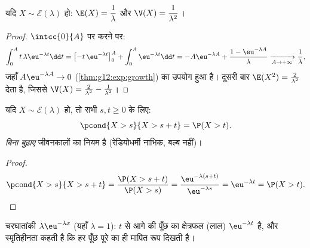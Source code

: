 \begin{proposition}\label{prop:g12:contdist:expomoments}
यदि $X \sim \mathcal E(\lambda)$ हो: $\E(X) = \dfrac{1}{\lambda}$ और $\V(X) = \dfrac{1}{\lambda^2}$।
\end{proposition}

\begin{proof}
$\intcc{0}{A}$ पर  करने पर:
\[
\int_0^A t\,\lambda\eu^{-\lambda t}\dd t
= \bigl[-t\,\eu^{-\lambda t}\bigr]_0^A + \int_0^A \eu^{-\lambda t}\dd t
= -A\eu^{-\lambda A} + \frac{1 - \eu^{-\lambda A}}{\lambda}
\xrightarrow[A\to+\infty]{} \frac1\lambda,
\]
जहाँ $A\eu^{-\lambda A} \to 0$ (\cref{thm:g12:exp:growth}) का उपयोग हुआ है। दूसरी बार  $\E(X^2) = \frac{2}{\lambda^2}$ देता है, जिससे
$\V(X) = \frac{2}{\lambda^2} - \frac{1}{\lambda^2}$।
\end{proof}

\begin{theorem}[स्मृतिहीनता]\label{thm:g12:contdist:memoryless}
यदि $X \sim \mathcal E(\lambda)$ हो, तो सभी $s, t \geq 0$ के लिए:
\[
\pcond{X > s}{X > s + t} = \P(X > t) .
\]
 \emph{बिना बुढ़ाए} जीवनकालों का नियम है (रेडियोधर्मी नाभिक,
बल्ब नहीं)।
\end{theorem}

\begin{proof}
\[
\pcond{X > s}{X > s+t}
= \frac{\P(X > s + t)}{\P(X > s)}
= \frac{\eu^{-\lambda(s+t)}}{\eu^{-\lambda s}} = \eu^{-\lambda t}
= \P(X > t). \qedhere
\]
\end{proof}

\begin{omfigure}

{\small चरघातांकी  $\lambda\eu^{-\lambda x}$ (यहाँ $\lambda = 1$): $t$ से आगे की पूँछ का क्षेत्रफल
(लाल) $\eu^{-\lambda t}$ है, और स्मृतिहीनता कहती है कि हर पूँछ पूरे  का ही मापित रूप
दिखती है।}
\end{omfigure}

